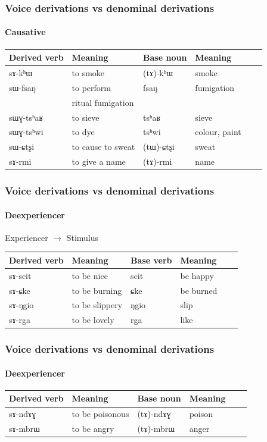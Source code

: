 \documentclass[xcolor=table]{beamer}
\newcommand{\ipa}[1]{{\phon \mbox{#1}}} %
\begin{document}
   \begin{frame} 
\frametitle{Voice derivations vs denominal derivations} 
\framesubtitle{Causative} 
 
 
\begin{tabular}{llllll}
\toprule
  Derived verb& Meaning &Base noun  & Meaning \\
\midrule
\ipa{sɤ-kʰɯ} & to smoke& \ipa{(tɤ)-kʰɯ} & smoke\\
 \ipa{sɯ-fsaŋ} & to perform  & \ipa{fsaŋ} & fumigation \\
&ritual fumigation\\
\ipa{sɯɣ-tsʰaʁ} & to sieve & \ipa{tsʰaʁ} & sieve\\
\ipa{sɯɣ-tsʰwi} & to dye & \ipa{tsʰwi} & colour, paint\\
 \ipa{sɯ-ɕtʂi}& to cause to sweat & \ipa{(tɯ)-ɕtʂi} & sweat\\
 \ipa{sɤ-rmi} & to give a name & \ipa{(tɤ)-rmi} & name\\
\bottomrule
\end{tabular}
\end{frame}  

   \begin{frame} 
\frametitle{Voice derivations vs denominal derivations} 
\framesubtitle{Deexperiencer} 

Experiencer $\rightarrow$ Stimulus

\begin{tabular}{llllll}
\toprule
  Derived verb& Meaning &Base verb  & Meaning \\
\midrule
 \ipa{sɤ-scit} & to be nice & \ipa{scit} & be happy \\
 \ipa{sɤ-ɕke} & to be burning & \ipa{ɕke} & be burned \\
 \ipa{sɤ-ŋgio} & to be slippery & \ipa{ŋgio} & slip \\
 \ipa{sɤ-rga} & to be lovely & \ipa{rga} & like \\
\bottomrule
\end{tabular}
\end{frame}    

   \begin{frame} 
\frametitle{Voice derivations vs denominal derivations} 
\framesubtitle{Deexperiencer} 
\begin{tabular}{llllll}
\toprule
  Derived verb& Meaning &Base noun  & Meaning \\
\midrule
 \ipa{sɤ-ndɤɣ} & to be poisonous & \ipa{(tɤ)-ndɤɣ} & poison \\
 \ipa{sɤ-mbrɯ} & to be angry & \ipa{(tɤ)-mbrɯ} & anger \\
\bottomrule
\end{tabular}
\end{frame}    
\end{document}
